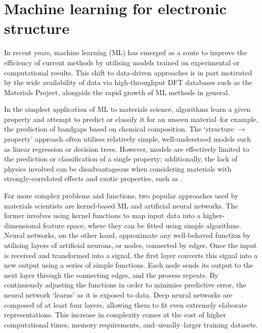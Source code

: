\documentclass[11pt,a4paper,twoside]{report}  %
\numberwithin{equation}{section}					%
\numberwithin{figure}{section}						%
\begin{document}
\section{Machine learning for electronic structure}

In recent years, machine learning (ML) has emerged as a route to improve the efficiency of current methods by utilising models trained on experimental or computational results. This shift to data-driven approaches is in part motivated by the wide availability of data via high-throughput DFT databases such as the Materials Project, alongside the rapid growth of ML methods in general\autocite{ceriottiMachineLearningMeets2021}. 

In the simplest application of ML to materials science, algorithms learn a given property and attempt to predict or classify it for an unseen material--for example, the prediction of bandgaps based on chemical composition\autocite{MachineLearningMaterials}. The `structure $\rightarrow$ property' approach often utilises relatively simple, well-understood models such as linear regression or decision trees. However, models are effectively limited to the prediction or classification of a single property; additionally, the lack of physics involved can be disadvantageous when considering materials with strongly-correlated effects and exotic properties, such as . 

For more complex problems and functions, two popular approaches used by materials scientists are kernel-based ML and artificial neural networks\autocite{ruppGuestEditorialSpecial2018}. The former involves using kernel functions to map input data into a higher-dimensional feature space, where they can be fitted using simple algorithms. Neural networks, on the other hand, approximate any well-behaved function by utilising layers of artificial neurons, or nodes, connected by edges. Once the input is received and transformed into a signal, the first layer converts this signal into a new output using a series of simple functions. Each node sends its output to the next layer through the connecting edges, and the process repeats. By continuously adjusting the functions in order to minimise predictive error, the neural network `learns' as it is exposed to data. Deep neural networks are composed of at least four layers, allowing them to fit even extremely elaborate representations. This increase in complexity comes at the cost of higher computational times, memory requirements, and--usually--larger training datasets.
\end{document}
